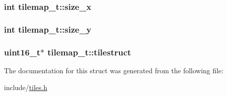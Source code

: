 \subsubsection[{\texorpdfstring{size\+\_\+x}{size\_x}}]{\setlength{\rightskip}{0pt plus 5cm}int tilemap\+\_\+t\+::size\+\_\+x}\hypertarget{structtilemap__t_a294a1064701b2f0d356919c24814a678}{}\label{structtilemap__t_a294a1064701b2f0d356919c24814a678}
\subsubsection[{\texorpdfstring{size\+\_\+y}{size\_y}}]{\setlength{\rightskip}{0pt plus 5cm}int tilemap\+\_\+t\+::size\+\_\+y}\hypertarget{structtilemap__t_a555e62b4a049be1c58a2bb7484bdf0c1}{}\label{structtilemap__t_a555e62b4a049be1c58a2bb7484bdf0c1}
\subsubsection[{\texorpdfstring{tilestruct}{tilestruct}}]{\setlength{\rightskip}{0pt plus 5cm}uint16\+\_\+t$\ast$ tilemap\+\_\+t\+::tilestruct}\hypertarget{structtilemap__t_aa8265d7200ace9d16f81dd5600958c34}{}\label{structtilemap__t_aa8265d7200ace9d16f81dd5600958c34}


The documentation for this struct was generated from the following file\+:\begin{DoxyCompactItemize}
\item 
include/\hyperlink{tiles_8h}{tiles.\+h}\end{DoxyCompactItemize}
